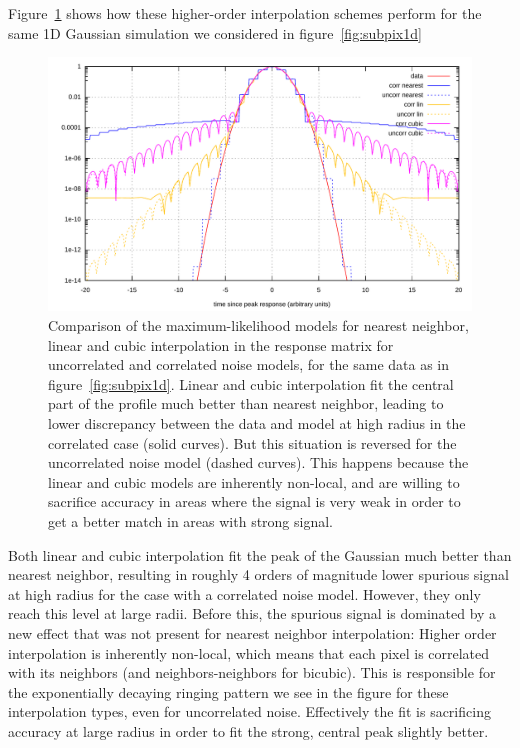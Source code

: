 \documentclass{article}
\begin{document}
Figure~\ref{fig:highorder1d} shows how these higher-order interpolation schemes perform for the same
1D Gaussian simulation we considered in figure~\ref{fig:subpix1d}
\begin{figure}[ph!]
	\centering
	\includegraphics[width=\textwidth]{examples/src_1d_highorder.pdf}
	\caption{Comparison of the maximum-likelihood models for nearest neighbor,
		linear and cubic interpolation in the response matrix for uncorrelated and correlated
		noise models, for the same data as in figure~\ref{fig:subpix1d}. Linear and cubic interpolation fit the
		central part of the profile much better than nearest neighbor, leading to lower discrepancy
		between the data and model at high radius in the correlated case (solid curves).
		But this situation is reversed for the uncorrelated
		noise model (dashed curves). This happens because the linear and cubic models are inherently non-local,
		and are willing to sacrifice accuracy in areas where the signal is very weak in order to
		get a better match in areas with strong signal.}
	\label{fig:highorder1d}
\end{figure}
Both linear and cubic interpolation fit the peak of the Gaussian much better than nearest neighbor,
resulting in roughly 4 orders of magnitude lower spurious signal at high radius for the case with
a correlated noise model. However, they only reach this level at large radii. Before this, the
spurious signal is dominated by a new effect that was not present for nearest neighbor interpolation:
Higher order interpolation is inherently non-local, which means that each pixel is correlated with
its neighbors (and neighbors-neighbors for bicubic). This is responsible for the exponentially
decaying ringing pattern we see in the figure for these interpolation types, even for uncorrelated noise.
Effectively the fit is sacrificing accuracy at large radius in order to fit the strong, central
peak slightly better.
\end{document}
